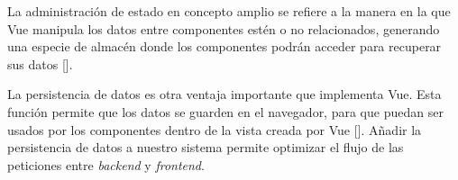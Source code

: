 La administración de estado en concepto amplio se refiere a la manera en la que Vue manipula los datos entre componentes estén o no relacionados, generando una especie de almacén donde los componentes podrán acceder para recuperar sus datos [\cite{52}].

La persistencia de datos es otra ventaja importante que implementa Vue. Esta función permite que los datos se guarden en el navegador, para que puedan ser usados por los componentes dentro de la vista creada por Vue [\cite{50}]. Añadir la persistencia de datos a nuestro sistema permite optimizar el flujo de las peticiones entre \textit{backend} y \textit{frontend}.





